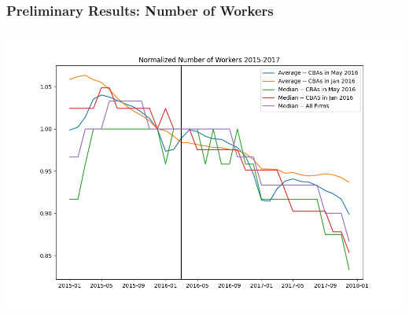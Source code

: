 \documentclass[aspectratio=169]{beamer}
\begin{document}
		\begin{frame}
			\frametitle{Preliminary Results: Number of Workers}
			\label{normalized_avg_med_emp}
			\hyperlink{normalized_avg_emp}{}
			\centering
			\includegraphics[scale = .4]{tables-figures/normalized_avg_med_emp_2015_2017.png}
		\end{frame}

	
\end{document}
